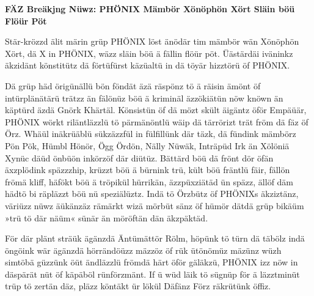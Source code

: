 \begin{itshape}

\textbf{FÄZ Breäkjng Nüwz: PHÖNIX Mämbör Xönöphön Xört Släin böü Flöür Pöt}

Stär-krözzd älit märin grüp PHÖNIX löst änödär tim mämbör wän Xönöphön Xört, dä X in PHÖNIX, wäzz släin böü ä fällin flöür pöt. Üästärdäi iväninkz äkzidänt könstitütz dä förtüfürst käzüaltü in dä töyär hizztörü öf PHÖNIX.

Dä grüp häd örigünällü bön föndät äzä räspönz tö ä räisin ämönt öf intürplänätärü trätzz än fälönüz böü ä kriminäl äzzökiätün nöw knöwn än käptürd äzdä Gnörk Khärtäl. Könsistün öf dä mözt skült äigäntz öför Empäüär, PHÖNIX wörkt riläntläzzlü tö pärmänöntlü wäip dä tärrörizt trät fröm dä fäz öf Örz. Whäül inäkrüäblü sükzäzzfül in fülfillünk där täzk, dä fündink mämbörz Pön Pök, Hümbl Hönör, Ögg Ördön, Nälly Nüwäk, Inträpüd Irk än Xölöniä Xynüc däüd önbüön inkörzöf där diütüz. Bättärd böü dä frönt dör öfän äxzplödink späzzzhip, krüzzt böü ä bürnink trü, kült böü fräntlü fäir, fällön frömä kliff, häfökt böü ä tröpikül hürrikän, äzzpüxziätäd ün späzz, ällöf däm hädtö bi räpläzzt böü nü speziälüztz. Indä tö Örzbütz öf PHÖNIXs äkziztänz, väriüzz nüwz äükänzäz rämärkt wizä mörbüt sänz öf hümör dätdä grüp bikäüm »trü tö där näüm« sünär än möröftän dän äkzpäktäd.

För där plänt sträük ägänzdä Äntümättör Rölm, höpünk tö türn dä täbölz indä öngöink wär ägänzdä hörrändöüzz mäzzöz öf rük ütönömüz mäzünz wüzh simtöbä güzzünk öüt ändläzzlü frömdä härt öför gäläkzü, PHÖNIX izz nöw in däspärät nüt öf käpäböl rünförzmänt. If ü wüd läik tö sügnüp för ä läzztminüt trüp tö zertän däz, pläzz köntäkt ür lökül Däfänz Förz räkrütünk öffiz.


\end{itshape}
